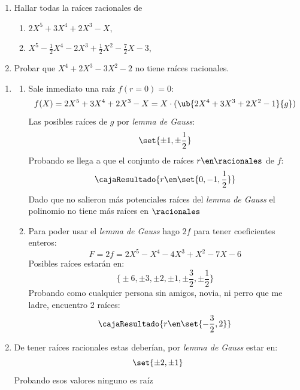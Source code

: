\begin{enunciado}{\ejercicio}
  \begin{enumerate}[label=\roman*)]
    \item Hallar todas la raíces racionales de
          \begin{enumerate}[label=(\alph*)]
            \item $2X^5 + 3X^4 + 2X^3 - X$,
            \item $X^5 - \frac{1}{2} X^4 - 2X^3 + \frac{1}{2} X^2 - \frac{7}{2}X -3$,
          \end{enumerate}
    \item Probar que $X^4 + 2X^3 - 3X^2 - 2$ no tiene raíces racionales.
  \end{enumerate}
\end{enunciado}

\begin{enumerate}[label=\roman*)]
  \item
        \begin{enumerate}[label=(\alph*)]
          \item Sale inmediato una raíz $f(r = 0) = 0$:
                $$
                  f(X) = 2X^5 + 3X^4 + 2X^3 - X = X \cdot (\ub{2X^4 + 3 X^3 + 2X^2 - 1}{g})
                $$
                Las posibles raíces de $g$ por \textit{lemma de Gauss}:
                $$
                  \set{\pm 1, \pm \frac{1}{2}}
                $$
                Probando se llega a que el conjunto de raíces $r \en \racionales$ de $f$:
                $$
                  \cajaResultado{
                    r \en \set{0, -1, \frac{1}{2}}
                  }
                $$
                Dado que no salieron más potenciales raíces del \textit{lemma de Gauss} el polinomio no tiene más raíces en $\racionales$

          \item
                Para poder usar el \textit{lemma de Gauss} hago $2f$ para tener coeficientes enteros:
                $$
                  F = 2f = 2X^5 - X^4 - 4X^3 + X^2 - 7X - 6
                $$
                Posibles raíces estarán en:
                $$
                  \big\{
                  \pm6, \pm 3, \pm 2, \pm 1, \pm \frac{3}{2}, \pm \frac{1}{2}
                  \big\}
                $$
                Probando como cualquier persona \textcolor{black!10}{sin amigos, novia, ni perro que me ladre}, encuentro 2 raíces:
                $$
                  \cajaResultado{
                    r \en \set{-\frac{3}{2}, 2}
                  }
                $$

        \end{enumerate}
  \item De tener raíces racionales estas deberían, por \textit{lemma de Gauss} estar en:
        $$
          \set{\pm2, \pm1}
        $$
        Probando esos valores ninguno es raíz
\end{enumerate}

\begin{aportes}
  \item {}
  \item {}
\end{aportes}
